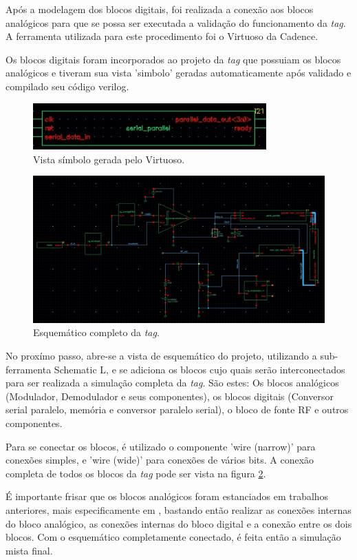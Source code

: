 Após a modelagem dos blocos digitais, foi realizada a conexão aos blocos analógicos para que se possa ser executada a validação do funcionamento da \textit{tag}. A ferramenta utilizada para este procedimento foi o 
Virtuoso da Cadence. 

Os blocos digitais foram incorporados ao projeto da \textit{tag} que possuiam os blocos analógicos e tiveram sua vista 'simbolo' geradas automaticamente após validado e compilado seu código verilog.

\begin{figure}[ht!]
  \centering
  \includegraphics[width=0.8\textwidth]{figuras/blocosp.jpg}
  \caption{Vista símbolo gerada pelo Virtuoso.}
  \label{blocosp}
\end{figure}

\begin{figure}[ht!]
  \centering
  \includegraphics[width=\textwidth]{figuras/todosblocos.jpg}
  \caption{Esquemático completo da \textit{tag}.}
  \label{todosblocos}
\end{figure}

No proxímo passo, abre-se a vista de esquemático do projeto, utilizando a sub-ferramenta Schematic L, e se adiciona os blocos cujo quais serão interconectados para ser realizada a simulação completa da \textit{tag}.
São estes: Os blocos analógicos (Modulador, Demodulador e seus componentes), os blocos digitais (Conversor serial paralelo, memória e conversor paralelo serial), o bloco de fonte RF e outros componentes.

Para se conectar os blocos, é utilizado o componente 'wire (narrow)' para conexões simples, e 'wire (wide)' para conexões de vários bits. A conexão completa de todos os blocos da \textit{tag} pode ser vista na figura \ref{todosblocos}.

É importante frisar que os blocos analógicos foram estanciados em trabalhos anteriores, mais especificamente em \cite{Marlon}, bastando então realizar as conexões internas do bloco analógico, as conexões internas do bloco digital e a conexão entre os dois blocos. Com o esquemático completamente conectado, é feita então a simulação mista final.

